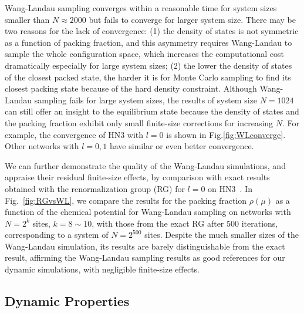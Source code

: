 Wang-Landau sampling converges within a reasonable time for system
sizes smaller than $N\approx2000$ but fails to converge for larger
system size. There may be two reasons for the lack of convergence:
(1) the density of states is not symmetric as a function of packing
fraction, and this asymmetry requires Wang-Landau to sample the whole
configuration space, which increases the computational cost dramatically
especially for large system sizes; (2) the lower the density of states
of the closest packed state, the harder it is for Monte Carlo sampling
to find its closest packing state because of the hard density constraint.
Although Wang-Landau sampling fails for large system sizes, the results
of system size $N=1024$ can still offer an insight to the equilibrium
state because the density of states and the packing fraction exhibit only small 
finite-size corrections for increasing $N$. For example, the convergence of HN3
with $l=0$ is shown in Fig.\ref{fig:WLconverge}. Other networks
with $l=0,1$ have similar or even better convergence.

We can further demonstrate the quality of the Wang-Landau simulations,
and appraise their residual finite-size effects, by comparison with
exact results obtained with the renormalization group (RG) for $l=0$
on HN3~\cite{BoHa11}. In Fig.~\ref{fig:RGvsWL}, we compare the results
for the packing fraction $\rho(\mu)$ as a function of the chemical
potential for Wang-Landau sampling on networks with $N=2^{k}$ sites, $k=8\sim10$,
with those from the exact RG after 500 iterations, corresponding
to a system of $N=2^{500}$ sites. Despite the much smaller sizes
of the Wang-Landau simulation, its results are barely distinguishable
from the exact result, affirming the Wang-Landau sampling results
as good references for our dynamic simulations, with negligible finite-size
effects.


\subsection{Dynamic Properties}

